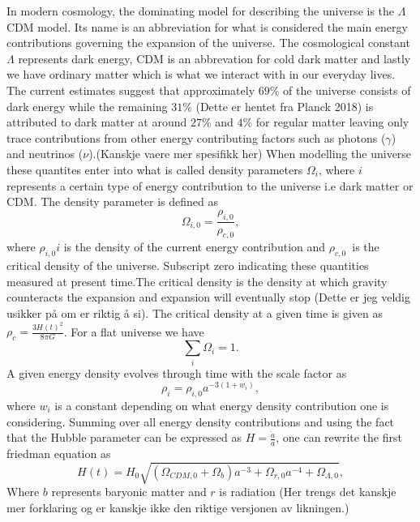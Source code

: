 In modern cosmology, the dominating model for describing the universe is the $\Lambda$CDM model. Its name is an abbreviation for what 
is considered the main energy contributions governing the expansion of the universe. The cosmological constant $\Lambda$ represents dark energy, CDM is an abbrevation for cold dark matter
and lastly we have ordinary matter which is what we interact with in our everyday lives. The current estimates suggest that approximately $69\%$ of the universe consists of dark energy while the remaining $31\%$ (Dette er hentet fra Planck 2018) is attributed to dark matter at around 
$27\%$ and $4\%$ for regular matter leaving only trace contributions from other energy contributing factors such as photons ($\gamma$) and neutrinos ($\nu$).(Kanskje vaere mer spesifikk her) When modelling the universe these quantites enter into 
what is called density parameters $\Omega_i$, where $i$ represents a certain type of energy contribution to the universe i.e dark matter or CDM. The density parameter is defined as
\begin{equation}
    \Omega_{i,0} = \frac{\rho_{i,0}}{\rho_{c,0}},
\end{equation}
where $\rho_{i,0}i$ is the density of the current energy contribution and $\rho_{c,0}$ is
the critical density of the universe. Subscript zero indicating these quantities
measured at present time.The critical density is the density at
which gravity counteracts the expansion and expansion will eventually stop
(Dette er jeg veldig usikker på om er riktig å si). The critical density at a
given time is given as $\rho_c=\frac{3H(t)^2}{8\pi G}$. For a flat universe we have
\begin{equation}
    \sum_i \Omega_i = 1.
\end{equation}
A given energy density evolves through time with the scale
factor as
\begin{equation}
    \rho_i=\rho_{i,0}a^{-3(1+w_i)},
\end{equation}
where $w_i$ is a constant depending on what energy density contribution one is
considering. Summing over all energy
density contributions and using the fact that the Hubble parameter can be
expressed as $H=\frac{\dot{a}}{a}$, one can rewrite the first friedman equation
as
\begin{equation}
    H(t)=H_0\sqrt{(\Omega_{CDM,0} + \Omega_{b})a^{-3} + \Omega_{r,0}a^{-4} + \Omega_{\Lambda,0}},
\end{equation}
Where $b$ represents baryonic matter and $r$ is radiation
(Her trengs det kanskje mer forklaring og er kanskje ikke den riktige versjonen
av likningen.) 



